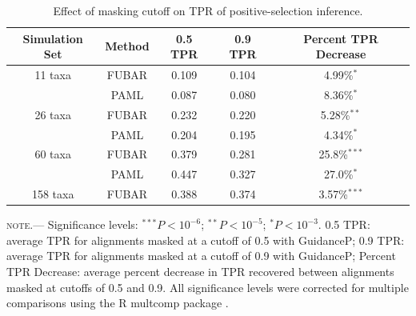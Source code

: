 \documentclass[11pt]{article}
\begin{document}
\begin{table}
\caption {\label{tab:cutoffs} Effect of masking cutoff on TPR of positive-selection inference.}
\begin{tabular}{c c c c c}
\hline\noalign{\smallskip}
Simulation Set & Method & 0.5 TPR & 0.9 TPR & Percent TPR Decrease \\ 
\hline\noalign{\smallskip}
11 taxa & FUBAR & 0.109 & 0.104 & 4.99\%$^{\ast}$\\ 
             & PAML   & 0.087 & 0.080 & 8.36\%$^{\ast}$\\ 
26 taxa & FUBAR & 0.232 & 0.220 & 5.28\%$^{\ast\ast}$\\
             & PAML   & 0.204 & 0.195 &  4.34\%$^{\ast}$\\ 
60 taxa & FUBAR & 0.379 & 0.281 & 25.8\%$^{\ast\ast\ast}$\\
             & PAML    & 0.447 & 0.327 & 27.0\%$^{\ast}$\\ 
158 taxa & FUBAR & 0.388 & 0.374  & 3.57\%$^{\ast\ast\ast}$\\
\hline
\end{tabular}
\newline
\textsc{note.}--- Significance levels: $^{\ast\ast\ast} P < 10^{-6}$; $^{\ast\ast} P < 10^{-5}$; $^{\ast} P < 10^{-3}$. 
0.5 TPR: average TPR for alignments masked at a cutoff of 0.5 with GuidanceP; 0.9 TPR: average TPR for alignments masked at a cutoff of 0.9 with GuidanceP; Percent TPR Decrease: average percent decrease in TPR recovered between alignments masked at cutoffs of 0.5 and 0.9. All significance levels were corrected for multiple comparisons using the R multcomp package \citep{Hothorn2008}.
\end{table}



	
\end{document}
